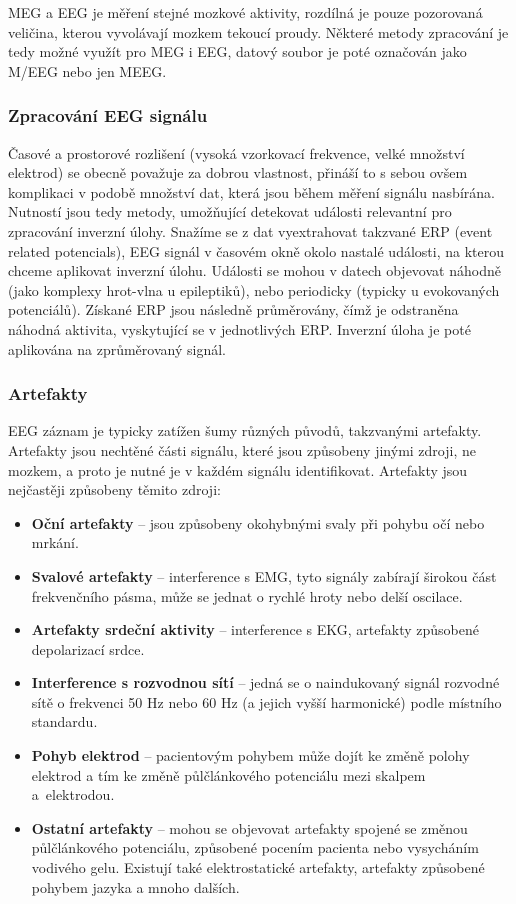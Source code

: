 MEG a EEG je měření stejné mozkové aktivity, rozdílná je pouze pozorovaná veličina, kterou vyvolávají mozkem tekoucí proudy. Některé metody zpracování je tedy možné využít pro MEG i EEG, datový soubor je poté označován jako M/EEG nebo jen MEEG.

\subsubsection{Zpracování EEG signálu}
Časové a prostorové rozlišení (vysoká vzorkovací frekvence, velké množství elektrod) se obecně považuje za dobrou vlastnost, přináší to s sebou ovšem komplikaci v podobě množství dat, která jsou během měření signálu nasbírána. Nutností jsou tedy metody, umožňující detekovat události relevantní pro zpracování inverzní úlohy. Snažíme se z dat vyextrahovat takzvané ERP (event related potencials), EEG signál v časovém okně okolo nastalé události, na kterou chceme aplikovat inverzní úlohu. Události se mohou v datech objevovat náhodně (jako komplexy hrot-vlna u epileptiků), nebo periodicky (typicky u evokovaných potenciálů). Získané ERP jsou následně průměrovány, čímž je odstraněna náhodná aktivita, vyskytující se v jednotlivých ERP. Inverzní úloha je poté aplikována na zprůměrovaný signál.

\subsubsection{Artefakty}
EEG záznam je typicky zatížen šumy různých původů, takzvanými artefakty. Artefakty jsou nechtěné části signálu, které jsou způsobeny jinými zdroji, ne mozkem, a proto je nutné je v každém signálu identifikovat. Artefakty jsou nejčastěji způsobeny těmito zdroji:

\begin{itemize}
\item \textbf{Oční artefakty} – jsou způsobeny okohybnými svaly při pohybu očí nebo mrkání.
\item \textbf{Svalové artefakty} – interference s EMG, tyto signály zabírají širokou část frekvenčního pásma, může se jednat o rychlé hroty nebo delší oscilace.
\item \textbf{Artefakty srdeční aktivity} – interference s EKG, artefakty způsobené depolarizací srdce.
\item \textbf{Interference s rozvodnou sítí} – jedná se o naindukovaný signál rozvodné sítě o frekvenci 50 Hz nebo 60 Hz (a jejich vyšší harmonické) podle místního standardu.
\item \textbf{Pohyb elektrod} – pacientovým pohybem může dojít ke změně polohy elektrod a tím ke změně půlčlánkového potenciálu mezi skalpem a~elektrodou.
\item \textbf{Ostatní artefakty} – mohou se objevovat artefakty spojené se změnou půlčlánkového potenciálu, způsobené pocením pacienta nebo vysycháním vodivého gelu. Existují také elektrostatické artefakty, artefakty způsobené pohybem jazyka a mnoho dalších.
\end{itemize}

